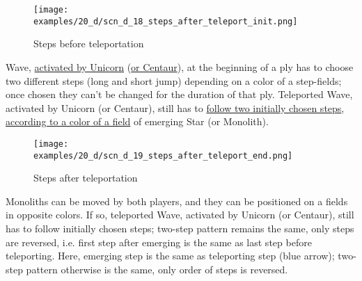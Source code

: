 \vspace*{-1.4\baselineskip}
\noindent
\begin{figure}[!h]
\texttt{[image: examples/20\_d/scn\_d\_18\_steps\_after\_teleport\_init.png]}
\vspace*{-1.3\baselineskip}
\caption{Steps before teleportation}
\label{fig:scn_d_18_steps_after_teleport_init}
\end{figure}

\vspace*{-0.3\baselineskip}
Wave, \hyperref[fig:scn_mv_22_wave_activation_by_unicorn_first_step]{activated by Unicorn}
(\hyperref[fig:scn_hd_07_wave_activation_by_centaur_first_step]{or Centaur}), at the
beginning of a ply has to choose two different steps (long and short jump) depending
on a color of a step-fields; once chosen they can't be changed for the duration of
that ply. Teleported Wave, activated by Unicorn (or Centaur), still has to
\hyperref[fig:scn_n_07_teleport_wave_init]{follow two initially chosen steps},
\hyperref[fig:scn_n_09_teleport_wave_2_init]{according to a color of a field}
of emerging Star (or Monolith).

\clearpage %

\vspace*{-2.3\baselineskip}
\noindent
\begin{figure}[!h]
\texttt{[image: examples/20\_d/scn\_d\_19\_steps\_after\_teleport\_end.png]}
\vspace*{-1.3\baselineskip}
\caption{Steps after teleportation}
\label{fig:scn_d_19_steps_after_teleport_end}
\end{figure}

\vspace*{-0.3\baselineskip}
Monoliths can be moved by both players, and they can be positioned on a fields in
opposite colors. If so, teleported Wave, activated by Unicorn (or Centaur), still
has to follow initially chosen steps; two-step pattern remains the same, only steps
are reversed, i.e. first step after emerging is the same as last step before
teleporting. \newline
Here, emerging step is the same as teleporting step (blue arrow); two-step pattern
otherwise is the same, only order of steps is reversed.

\clearpage %

